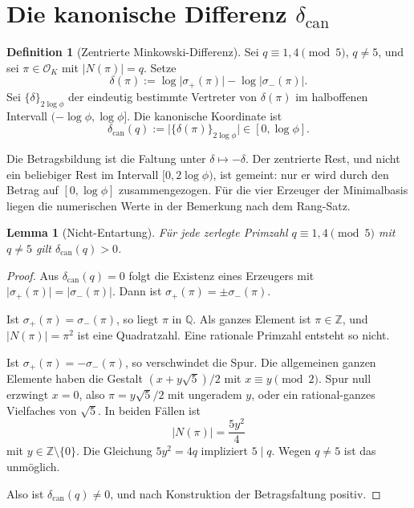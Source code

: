 \documentclass[11pt,a4paper]{article}
\theoremstyle{plain}
\newtheorem{lemma}[theorem]{Lemma}
\theoremstyle{definition}
\newtheorem{definition}[theorem]{Definition}
\newcommand{\Z}{\mathbb{Z}}
\newcommand{\Q}{\mathbb{Q}}
\newcommand{\OK}{\mathcal{O}_K}
\numberwithin{equation}{section}
\begin{document}
\section{Die kanonische Differenz \texorpdfstring{$\delta_{\mathrm{can}}$}{delta}}

\begin{definition}[Zentrierte Minkowski-Differenz]
Sei $q\equiv 1,4\pmod{5}$, $q\neq 5$, und sei $\pi\in\OK$ mit $\lvert N(\pi)\rvert=q$.
Setze
\begin{equation}
\delta(\pi):=\log\lvert\sigma_+(\pi)\rvert-\log\lvert\sigma_-(\pi)\rvert.
\end{equation}
Sei $\{\delta\}_{2\log\phi}$ der eindeutig bestimmte Vertreter von
$\delta(\pi)$ im halboffenen Intervall $(-\log\phi,\log\phi]$.
Die kanonische Koordinate ist
\begin{equation}
\delta_{\mathrm{can}}(q)
:=\bigl\lvert\{\delta(\pi)\}_{2\log\phi}\bigr\rvert
\in[0,\log\phi].
\end{equation}
\end{definition}

Die Betragsbildung ist die Faltung unter $\delta\mapsto-\delta$.
Der zentrierte Rest, und nicht ein beliebiger Rest im Intervall
$[0,2\log\phi)$, ist gemeint: nur er wird durch den Betrag auf
$[0,\log\phi]$ zusammengezogen.
Für die vier Erzeuger der Minimalbasis liegen die numerischen Werte in der
Bemerkung nach dem Rang-Satz.

\begin{lemma}[Nicht-Entartung]
\label{lem:delta}
Für jede zerlegte Primzahl $q\equiv 1,4\pmod{5}$ mit $q\neq 5$ gilt
$\delta_{\mathrm{can}}(q)>0$.
\end{lemma}

\begin{proof}
Aus $\delta_{\mathrm{can}}(q)=0$ folgt die Existenz eines Erzeugers mit
$\lvert\sigma_+(\pi)\rvert=\lvert\sigma_-(\pi)\rvert$.
Dann ist $\sigma_+(\pi)=\pm\sigma_-(\pi)$.

Ist $\sigma_+(\pi)=\sigma_-(\pi)$, so liegt $\pi$ in $\Q$.
Als ganzes Element ist $\pi\in\Z$, und $\lvert N(\pi)\rvert=\pi^2$ ist eine
Quadratzahl. Eine rationale Primzahl entsteht so nicht.

Ist $\sigma_+(\pi)=-\sigma_-(\pi)$, so verschwindet die Spur.
Die allgemeinen ganzen Elemente haben die Gestalt $(x+y\sqrt{5})/2$ mit
$x\equiv y\pmod{2}$.
Spur null erzwingt $x=0$, also $\pi=y\sqrt{5}/2$ mit ungeradem $y$, oder ein
rational-ganzes Vielfaches von $\sqrt{5}$.
In beiden Fällen ist
\begin{equation}
\lvert N(\pi)\rvert=\frac{5y^2}{4}
\end{equation}
mit $y\in\Z\setminus\{0\}$.
Die Gleichung $5y^2=4q$ impliziert $5\mid q$.
Wegen $q\neq 5$ ist das unmöglich.

Also ist $\delta_{\mathrm{can}}(q)\neq 0$, und nach Konstruktion der
Betragsfaltung positiv.
\end{proof}
\end{document}
